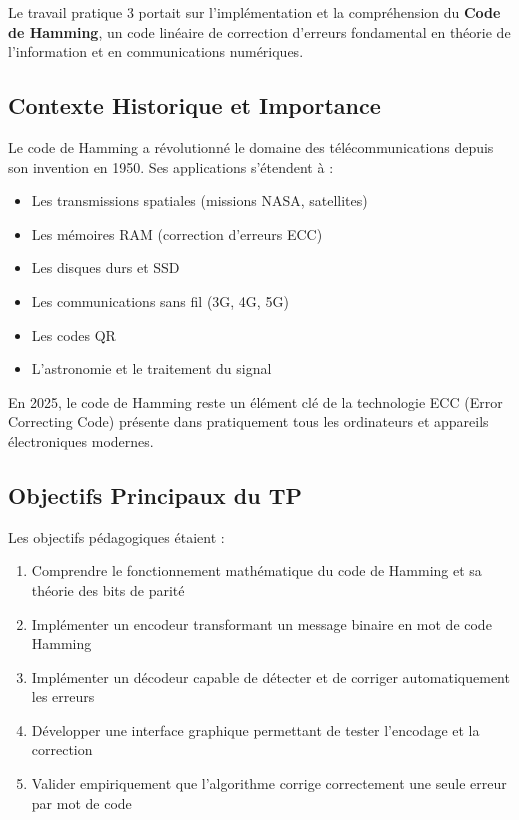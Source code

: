 \documentclass[12pt, a4paper]{article}
\begin{document}
Le travail pratique 3 portait sur l'implémentation et la compréhension du \textbf{Code de Hamming}, un code linéaire de correction d'erreurs fondamental en théorie de l'information et en communications numériques.

\subsection{Contexte Historique et Importance}

Le code de Hamming a révolutionné le domaine des télécommunications depuis son invention en 1950. Ses applications s'étendent à :
\begin{itemize}
    \item Les transmissions spatiales (missions NASA, satellites)
    \item Les mémoires RAM (correction d'erreurs ECC)
    \item Les disques durs et SSD
    \item Les communications sans fil (3G, 4G, 5G)
    \item Les codes QR
    \item L'astronomie et le traitement du signal
\end{itemize}

En 2025, le code de Hamming reste un élément clé de la technologie ECC (Error Correcting Code) présente dans pratiquement tous les ordinateurs et appareils électroniques modernes.

\subsection{Objectifs Principaux du TP}

Les objectifs pédagogiques étaient :

\begin{enumerate}
    \item Comprendre le fonctionnement mathématique du code de Hamming et sa théorie des bits de parité
    \item Implémenter un encodeur transformant un message binaire en mot de code Hamming
    \item Implémenter un décodeur capable de détecter et de corriger automatiquement les erreurs
    \item Développer une interface graphique permettant de tester l'encodage et la correction
    \item Valider empiriquement que l'algorithme corrige correctement une seule erreur par mot de code
\end{enumerate}
\end{document}
